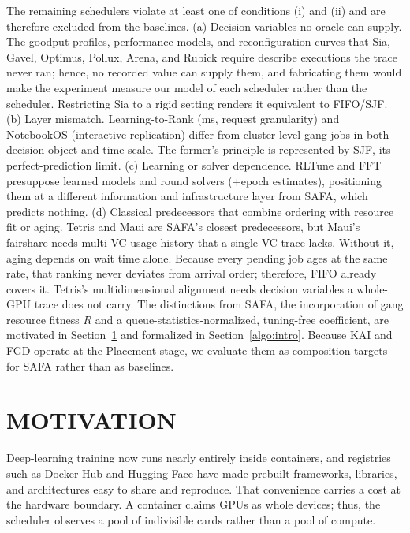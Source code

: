 \documentclass{ieeetj}
\begin{document}
The remaining schedulers violate at least one of conditions (i) and (ii) and are therefore excluded from the baselines. (a) Decision variables no oracle can supply. The goodput profiles, performance models, and reconfiguration curves that Sia, Gavel, Optimus, Pollux, Arena, and Rubick require describe executions the trace never ran; hence, no recorded value can supply them, and fabricating them would make the experiment measure our model of each scheduler rather than the scheduler. Restricting Sia to a rigid setting renders it equivalent to FIFO/SJF. (b) Layer mismatch. Learning-to-Rank (ms, request granularity) and NotebookOS (interactive replication) differ from cluster-level gang jobs in both decision object and time scale. The former's principle is represented by SJF, its perfect-prediction limit. (c) Learning or solver dependence. RLTune and FFT presuppose learned models and round solvers ($+$epoch estimates), positioning them at a different information and infrastructure layer from SAFA, which predicts nothing. (d) Classical predecessors that combine ordering with resource fit or aging. Tetris\cite{grandl2014multi} and Maui\cite{jackson2001maui} are SAFA's closest predecessors, but Maui's fairshare needs multi-VC usage history that a single-VC trace lacks. Without it, aging depends on wait time alone. Because every pending job ages at the same rate, that ranking never deviates from arrival order; therefore, FIFO already covers it. Tetris's multidimensional alignment needs decision variables a whole-GPU trace does not carry. The distinctions from SAFA, the incorporation of gang resource fitness $R$ and a queue-statistics-normalized, tuning-free coefficient, are motivated in Section~\ref{motivation} and formalized in Section~\ref{algo:intro}. Because KAI and FGD operate at the Placement stage, we evaluate them as composition targets for SAFA rather than as baselines.

\section{MOTIVATION}\label{motivation}
Deep-learning training now runs nearly entirely inside containers\cite{b7}, and registries such as Docker Hub\cite{b8} and Hugging Face\cite{b9} have made prebuilt frameworks, libraries, and architectures easy to share and reproduce. That convenience carries a cost at the hardware boundary. A container claims GPUs as whole devices; thus, the scheduler observes a pool of indivisible cards rather than a pool of compute.
\end{document}
